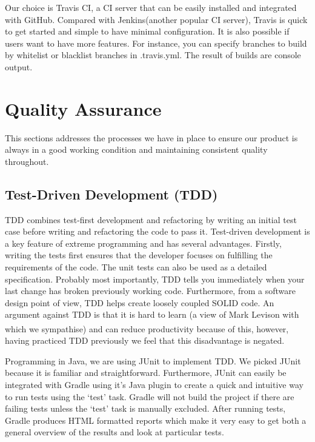\documentclass[10pt, a4paper]{article}
\begin{document}
Our choice is Travis CI, a CI server that can be easily installed and integrated with GitHub.  Compared with Jenkins(another popular CI server), Travis is quick to get started and simple to have minimal configuration. It is also possible if users want to have more features. For instance, you can specify branches to build by whitelist or blacklist branches in .travis.yml. The result of builds are console output.

\section{Quality Assurance}

This sections addresses the processes we have in place to ensure our product is always in a good working condition and maintaining consistent quality throughout.

\subsection{Test-Driven Development (TDD)}

TDD combines test-first development and refactoring by writing an initial test case before writing and refactoring the code to pass it. Test-driven development is a key feature of extreme programming and has several advantages. Firstly, writing the tests first ensures that the developer focuses on fulfilling the requirements of the code. The unit tests can also be used as a detailed specification. Probably most importantly, TDD tells you immediately when your last change has broken previously working code. Furthermore, from a software design point of view, TDD helps create loosely coupled SOLID code. An argument against TDD is that it is hard to learn (a view of Mark Levison with which we sympathise\textsuperscript{\cite{mark}}) and can reduce productivity because of this, however, having practiced TDD previously we feel that this disadvantage is negated. 

Programming in Java, we are using JUnit to implement TDD. We picked JUnit because it is familiar and straightforward. Furthermore, JUnit can easily be integrated with Gradle using it’s Java plugin to create a quick and intuitive way to run tests using the ‘test’ task. Gradle will not build the project if there are failing tests unless the ‘test’ task is manually excluded. After running tests, Gradle produces HTML formatted reports which make it very easy to get both a general overview of the results and look at particular tests.
\end{document}
